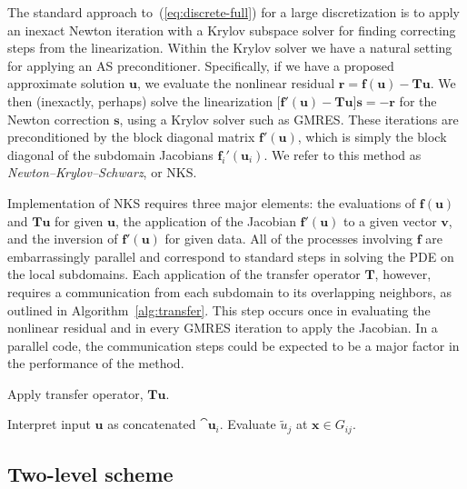 The standard approach to~(\ref{eq:discrete-full}) for a large discretization is to apply an inexact Newton iteration with a Krylov subspace solver for finding correcting steps from the linearization. Within the Krylov solver we have a natural setting for applying an AS preconditioner. Specifically, if we have a proposed approximate solution $\bm{u}$, we evaluate the nonlinear residual $\bm{r}=\bm{f}(\bm{u}) - \bm{T} \bm{u}$. We then (inexactly, perhaps) solve the linearization $\bigl[ \bm{f}'(\bm{u}) - \bm{T} \bm{u}\bigr] \bm{s}=-\bm{r}$ for the Newton correction $\bm{s}$, using a Krylov solver such as GMRES. These iterations are preconditioned by the block diagonal matrix $\bm{f}'(\bm{u})$, which is simply the block diagonal of the subdomain Jacobians $\bm{f}_i'(\bm{u}_i)$. We refer to this method as \emph{Newton--Krylov--Schwarz}, or NKS. 

Implementation of NKS requires three major elements: the evaluations of $\bm{f}(\bm{u})$ and $\bm{T} \bm{u}$ for given $\bm{u}$, the application of the Jacobian $\bm{f}'(\bm{u})$ to a given vector $\bm{v}$, and the inversion of $\bm{f}'(\bm{u})$ for given data. All of the processes involving $\bm{f}$ are embarrassingly parallel and correspond to standard steps in solving the PDE on the local subdomains. Each application of the transfer operator $\bm{T}$, however, requires a communication from each subdomain to its overlapping neighbors, as outlined in Algorithm~\ref{alg:transfer}. This step occurs once in evaluating the nonlinear residual and in every GMRES iteration to apply the Jacobian. In a parallel code, the communication steps could be expected to be a major factor in the performance of the method. 

\begin{algorithm}
  \caption{Apply transfer operator, $\bm{T}\bm{u}$.}
  \label{alg:transfer}
  \begin{algorithmic}
    \STATE Interpret input $\bm{u}$ as concatenated $\cat{\bm{u}_i}$.
    \STATE Evaluate $\tilde{u}_j$ at $\bm{x}\in G_{ij}$.
    \ENDFOR
    \ENDFOR
   \end{algorithmic}
\end{algorithm}

\subsection{Two-level scheme}
\label{sec:NKS-two-level}

